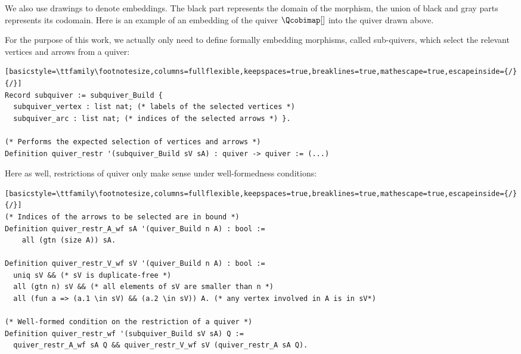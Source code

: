 We also use drawings to denote embeddings. The black part represents the domain of the morphism, the union of black and gray parts represents its codomain. Here is an example of an embedding of the quiver $\Qcobimap[]$ into the quiver drawn above.
\begin{center}
\end{center}

For the purpose of this work, we actually only need to define formally embedding morphisms, called sub-quivers, which select the relevant vertices and arrows from a quiver:
\begin{lstlisting}[basicstyle=\ttfamily\footnotesize,columns=fullflexible,keepspaces=true,breaklines=true,mathescape=true,escapeinside={/}{/}]
Record subquiver := subquiver_Build {
  subquiver_vertex : list nat; (* labels of the selected vertices *)
  subquiver_arc : list nat; (* indices of the selected arrows *) }.

(* Performs the expected selection of vertices and arrows *)
Definition quiver_restr '(subquiver_Build sV sA) : quiver -> quiver := (...)
\end{lstlisting}

Here as well, restrictions of quiver only make sense under well-formedness conditions:
\begin{lstlisting}[basicstyle=\ttfamily\footnotesize,columns=fullflexible,keepspaces=true,breaklines=true,mathescape=true,escapeinside={/}{/}]
(* Indices of the arrows to be selected are in bound *)
Definition quiver_restr_A_wf sA '(quiver_Build n A) : bool :=
    all (gtn (size A)) sA.

Definition quiver_restr_V_wf sV '(quiver_Build n A) : bool :=
  uniq sV && (* sV is duplicate-free *)
  all (gtn n) sV && (* all elements of sV are smaller than n *)
  all (fun a => (a.1 \in sV) && (a.2 \in sV)) A. (* any vertex involved in A is in sV*)

(* Well-formed condition on the restriction of a quiver *)
Definition quiver_restr_wf '(subquiver_Build sV sA) Q :=
  quiver_restr_A_wf sA Q && quiver_restr_V_wf sV (quiver_restr_A sA Q).
\end{lstlisting}

